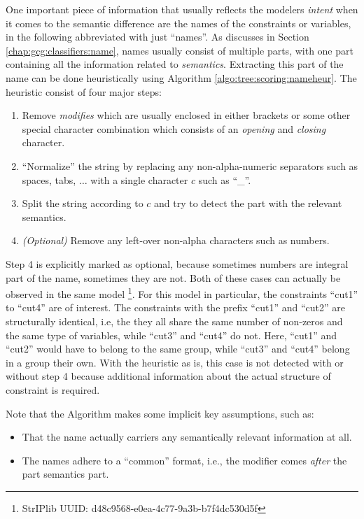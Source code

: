 			One important piece of information that usually reflects the modelers \textit{intent} when it comes to the semantic difference are the names of the constraints or variables, in the following abbreviated with just \enquote{names}.
			As discusses in Section \ref{chap:gcg:classifiers:name}, names usually consist of multiple parts, with one part containing all the information related to \textit{semantics}.
			Extracting this part of the name can be done heuristically using Algorithm \ref{algo:tree:scoring:nameheur}.
			The heuristic consist of four major steps:
			\begin{enumerate}
				\item Remove \textit{modifies} which are usually enclosed in either brackets or some other special character combination which consists of an \textit{opening} and \textit{closing} character.
				\item \enquote{Normalize} the string by replacing any non-alpha-numeric separators such as spaces, tabs, $\ldots$ with a single character $c$ such as \enquote{\_}.
				\item Split the string according to $c$ and try to detect the part with the relevant semantics. 
				\item \textit{(Optional)} Remove any left-over non-alpha characters such as numbers.
			\end{enumerate}
			
			Step 4 is explicitly marked as optional, because sometimes numbers are integral part of the name, sometimes they are not.
			Both of these cases can actually be observed in the same model \footnote{StrIPlib UUID: d48c9568-e0ea-4c77-9a3b-b7f4dc530d5f}.
			For this model in particular, the constraints \enquote{cut1} to \enquote{cut4} are of interest.
			The constraints with the prefix \enquote{cut1} and \enquote{cut2} are structurally identical, i.e, the they all share the same number of non-zeros and the same type of variables, while \enquote{cut3} and \enquote{cut4} do not.
			Here, \enquote{cut1} and \enquote{cut2} would have to belong to the same group, while \enquote{cut3} and \enquote{cut4} belong in a group their own.
			With the heuristic as is, this case is not detected with or without step 4 because additional information about the actual structure of constraint is required.
			
			Note that the Algorithm makes some implicit key assumptions, such as:
			\begin{itemize}
				\item That the name actually carriers any semantically relevant information at all.
				\item The names adhere to a \enquote{common} format, i.e., the modifier comes \textit{after} the part semantics part.
			\end{itemize}
			
